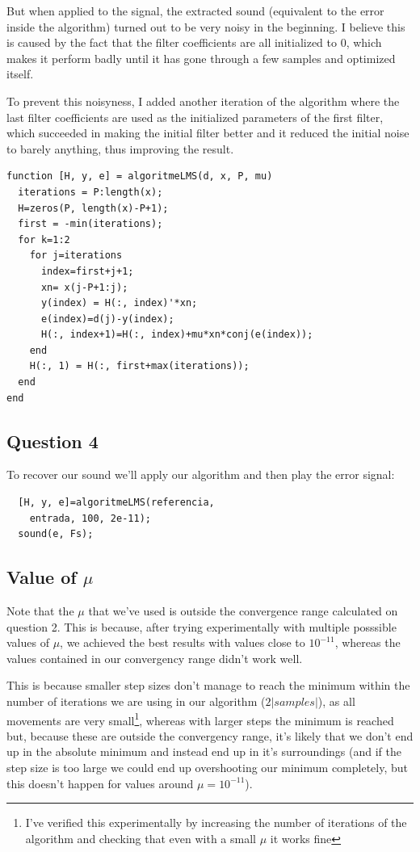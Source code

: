 \documentclass[conference,9pt]{IEEEtran}
\begin{document}
But when applied to the signal, the extracted sound (equivalent to the error inside the algorithm) turned out to be very noisy in the beginning. I believe this is caused by the fact that the filter coefficients are all initialized to 0, which makes it perform badly until it has gone through a few samples and optimized itself.

To prevent this noisyness, I added another iteration of the algorithm where the last filter coefficients are used as the initialized parameters of the first filter, which succeeded in making the initial filter better and it reduced the initial noise to barely anything, thus improving the result.
\begin{verbatim}
function [H, y, e] = algoritmeLMS(d, x, P, mu)
  iterations = P:length(x);
  H=zeros(P, length(x)-P+1);
  first = -min(iterations);
  for k=1:2
    for j=iterations
      index=first+j+1;
      xn= x(j-P+1:j);
      y(index) = H(:, index)'*xn;
      e(index)=d(j)-y(index);
      H(:, index+1)=H(:, index)+mu*xn*conj(e(index));
    end
    H(:, 1) = H(:, first+max(iterations));
  end
end
\end{verbatim}

\subsection{Question 4}
To recover our sound we'll apply our algorithm and then play the error signal:
\begin{verbatim}
  [H, y, e]=algoritmeLMS(referencia, 
    entrada, 100, 2e-11);
  sound(e, Fs);
\end{verbatim}

\subsection{Value of $\mu$}

Note that the $\mu$ that we've used is outside the convergence range calculated on question 2. This is because, after trying experimentally with multiple posssible values of $\mu$, we achieved the best results with values close to $10^{-11}$, whereas the values contained in our convergency range didn't work well.

This is because smaller step sizes don't manage to reach the minimum within the number of iterations we are using in our algorithm ($2|samples|$), as all movements are very small\footnote{I've verified this experimentally by increasing the number of iterations of the algorithm and checking that even with a small $\mu$ it works fine}, whereas with larger steps the minimum is reached but, because these are outside the convergency range, it's likely that we don't end up in the absolute minimum and instead end up in it's surroundings (and if the step size is too large we could end up overshooting our minimum completely, but this doesn't happen for values around $\mu=10^{-11}$).
\end{document}
